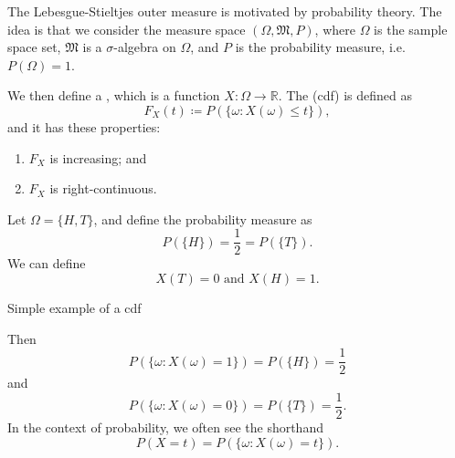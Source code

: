 \documentclass[notoc,notitlepage]{tufte-book}
\begin{document}
The Lebesgue-Stieltjes outer measure is motivated by probability theory.
The idea is that we consider the measure space $(\Omega, \mathfrak{M}, P)$,
where $\Omega$ is the sample space set,
$\mathfrak{M}$ is a $\sigma$-algebra on $\Omega$,
and $P$ is the probability measure, i.e. $P(\Omega) = 1$.

We then define a ,
which is a function $X : \Omega \to \mathbb{R}$.
The  (cdf)
is defined as
\begin{equation*}
  F_X(t) \coloneqq P(\{ \omega : X(\omega) \leq t \}),
\end{equation*}
and it has these properties:
\begin{enumerate}
  \item $F_X$ is increasing; and
  \item $F_X$ is right-continuous.
\end{enumerate}

\begin{eg}
  Let $\Omega = \{ H, T \}$, and define the probability measure as
  \begin{equation*}
    P(\{ H \}) = \frac{1}{2} = P(\{ T \}).
  \end{equation*}
  We can define
  \begin{equation*}
    X(T) = 0 \text{ and } X(H) = 1.
  \end{equation*}
  \begin{marginfigure}
    \centering
    \caption{Simple example of a cdf}\label{fig:simple_example_of_a_cdf}
  \end{marginfigure}
  Then
  \begin{equation*}
    P(\{ \omega : X(\omega) = 1\}) = P(\{ H \}) = \frac{1}{2}
  \end{equation*}
  and
  \begin{equation*}
    P(\{ \omega : X(\omega) = 0 \}) = P(\{ T \}) = \frac{1}{2}.
  \end{equation*}
  In the context of probability, we often see the shorthand
  \begin{equation*}
    P(X = t) = P(\{ \omega : X(\omega) = t \}).
  \end{equation*}
\end{eg}
\end{document}
